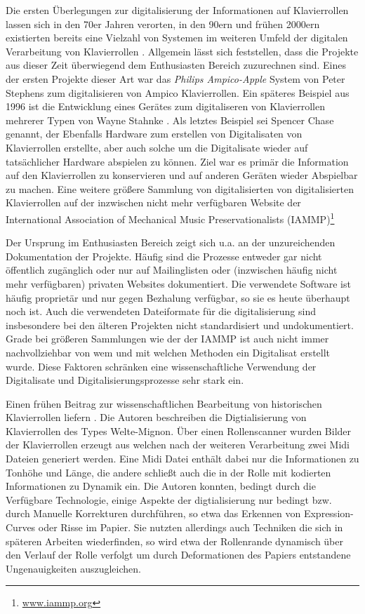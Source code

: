 Die ersten Überlegungen zur digitalisierung der Informationen auf Klavierrollen lassen sich in den 70er Jahren verorten, in den 90ern und frühen 2000ern existierten bereits eine Vielzahl von Systemen im weiteren Umfeld der digitalen Verarbeitung von Klavierrollen \autocite[]{colmenares_2011}.
Allgemein lässt sich feststellen, dass die Projekte aus dieser Zeit überwiegend dem Enthusiasten Bereich zuzurechnen sind.
Eines der ersten Projekte dieser Art war das \textit{Philips Ampico-Apple} System von Peter Stephens \parencite*[]{stephens} zum digitalisieren von Ampico Klavierrollen.
Ein späteres Beispiel aus 1996 ist die Entwicklung eines Gerätes zum digitaliseren von Klavierrollen mehrerer Typen von Wayne Stahnke \parencite[]{stahnke_1996}.
Als letztes Beispiel sei Spencer Chase \parencite*[]{chase_2003} genannt, der Ebenfalls Hardware zum erstellen von Digitalisaten von Klavierrollen erstellte, aber auch solche um die Digitalisate wieder auf tatsächlicher Hardware abspielen zu können.
Ziel war es primär die Information auf den Klavierrollen zu konservieren und auf anderen Geräten wieder Abspielbar zu machen.
Eine weitere größere Sammlung von digitalisierten von digitalisierten Klavierrollen auf der inzwischen nicht mehr verfügbaren Website der International Association of Mechanical Music Preservationalists (IAMMP)\footnote{\href{http://www.iammp.org/}{www.iammp.org}}

Der Ursprung im Enthusiasten Bereich zeigt sich u.a. an der unzureichenden Dokumentation der Projekte.
Häufig sind die Prozesse entweder gar nicht öffentlich zugänglich oder nur auf Mailinglisten oder (inzwischen häufig nicht mehr verfügbaren) privaten Websites dokumentiert.
Die verwendete Software ist häufig proprietär und nur gegen Bezhalung verfügbar, so sie es heute überhaupt noch ist.
Auch die verwendeten Dateiformate für die digitalisierung sind insbesondere bei den älteren Projekten nicht standardisiert und undokumentiert.
Grade bei größeren Sammlungen wie der der IAMMP ist auch nicht immer nachvollziehbar von wem und mit welchen Methoden ein Digitalisat erstellt wurde.
Diese Faktoren schränken eine wissenschaftliche Verwendung der Digitalisate und Digitalisierungsprozesse sehr stark ein.

Einen frühen Beitrag zur wissenschaftlichen Bearbeitung von historischen  Klavierrollen liefern \textcite[]{zoltan_1994}.
Die Autoren beschreiben die Digtialisierung von Klavierrollen des Types Welte-Mignon.
Über einen Rollenscanner wurden Bilder der Klavierrollen erzeugt aus welchen nach der weiteren Verarbeitung zwei Midi Dateien generiert werden.
Eine Midi Datei enthält dabei nur die Informationen zu Tonhöhe und Länge, die andere schließt auch die in der Rolle mit kodierten Informationen zu Dynamik ein.
Die Autoren konnten, bedingt durch die Verfügbare Technologie, einige Aspekte der digtialisierung nur bedingt bzw. durch Manuelle Korrekturen durchführen, so etwa das Erkennen von Expression-Curves oder Risse im Papier.
Sie nutzten allerdings auch Techniken die sich in späteren Arbeiten wiederfinden, so wird etwa der Rollenrande dynamisch über den Verlauf der Rolle verfolgt um durch Deformationen des Papiers entstandene Ungenauigkeiten auszugleichen.

